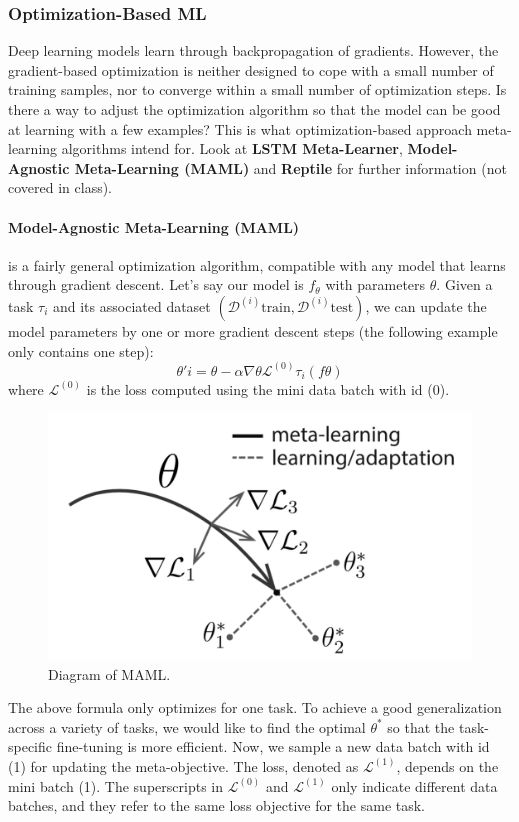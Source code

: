 \documentclass[main]{subfiles}
\begin{document}
\subsubsection{Optimization-Based ML}
Deep learning models learn through backpropagation of gradients. However, the gradient-based optimization is neither designed to cope with a small number of training samples, nor to converge within a small number of optimization steps. Is there a way to adjust the optimization algorithm so that the model can be good at learning with a few examples? This is what optimization-based approach meta-learning algorithms intend for. Look at \textbf{LSTM Meta-Learner}, \textbf{Model-Agnostic Meta-Learning (MAML)} and \textbf{Reptile} for further information (not covered in class). 

\paragraph{Model-Agnostic Meta-Learning (MAML)} is a fairly general optimization algorithm, compatible with any model that learns through gradient descent.
%
Let's say our model is $f_\theta$ with parameters $\theta$. Given a task $\tau_i$ and its associated dataset $(\mathcal{D}^{(i)}\text{train}, \mathcal{D}^{(i)}\text{test})$, we can update the model parameters by one or more gradient descent steps (the following example only contains one step):
%
$$ \theta'i = \theta - \alpha \nabla\theta\mathcal{L}^{(0)}{\tau_i}(f\theta) $$
%
where $\mathcal{L}^{(0)}$ is the loss computed using the mini data batch with id (0).
%
\begin{figure}[H]
    \centering
    \includegraphics[width=0.5\linewidth]{14_ContinualMetaAndTransferLearning/figures/maml.png}
    \caption{Diagram of MAML.}
    \label{fig:my_label}
\end{figure}
%
The above formula only optimizes for one task. To achieve a good generalization across a variety of tasks, we would like to find the optimal $\theta^*$ so that the task-specific fine-tuning is more efficient. Now, we sample a new data batch with id (1) for updating the meta-objective. The loss, denoted as $\mathcal{L}^{(1)}$, depends on the mini batch (1). The superscripts in $\mathcal{L}^{(0)}$ and $\mathcal{L}^{(1)}$ only indicate different data batches, and they refer to the same loss objective for the same task.
\end{document}
